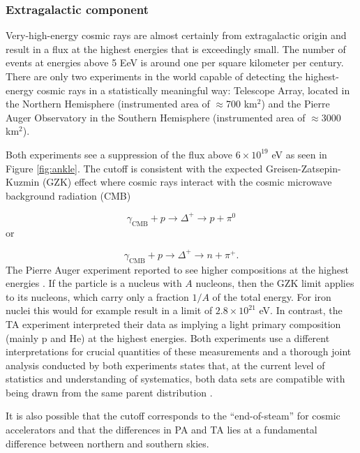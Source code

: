 \subsubsection{Extragalactic component}
\label{subsec:extragalactic}
Very-high-energy cosmic rays are almost certainly from extragalactic origin and result in a flux at the highest energies that is exceedingly small. The number of events at energies above 5 EeV is around one per square kilometer per century. There are only two experiments in the world capable of detecting the highest-energy cosmic rays in a statistically meaningful way: Telescope Array, located in the Northern Hemisphere (instrumented area of $\approx$700 km$^2$) and the Pierre Auger Observatory in the Southern Hemisphere (instrumented area of $\approx$3000 km$^2$).

Both experiments see a suppression of the flux above $6 \times 10^{19}$ eV as seen in Figure \ref{fig:ankle}. The cutoff is consistent with the expected Greisen-Zatsepin-Kuzmin (GZK) effect \cite{Greisen:1966jv,Zatsepin:1966jv} where cosmic rays interact with the cosmic microwave background radiation (CMB)

\begin{equation}
\gamma_{\textrm{CMB}} + p \rightarrow \Delta^+ \rightarrow p + \pi^0
\end{equation} 
or

\begin{equation}
\gamma_{\textrm{CMB}} + p \rightarrow \Delta^+ \rightarrow n + \pi^+.
\end{equation}
The Pierre Auger experiment reported to see higher compositions at the highest energies \cite{icrc2017:pa}. If the particle is a nucleus with $A$ nucleons, then the GZK limit applies to its nucleons, which carry only a fraction $1/A$ of the total energy. For iron nuclei this would for example result in a limit of $2.8 \times 10^{21}$ eV. In contrast, the TA experiment interpreted their data as implying a light primary composition (mainly p and He) at the highest energies. Both experiments use a different interpretations for crucial quantities of these measurements and a thorough joint analysis conducted by both experiments states that, at the current level of statistics and understanding of systematics, both data sets are compatible with being drawn from the same parent distribution \cite{PDG2018url}.

It is also possible that the cutoff corresponds to the ``end-of-steam'' for cosmic accelerators \cite{Allard:2008gj} and that the differences in PA and TA lies at a fundamental difference between northern and southern skies.\\

